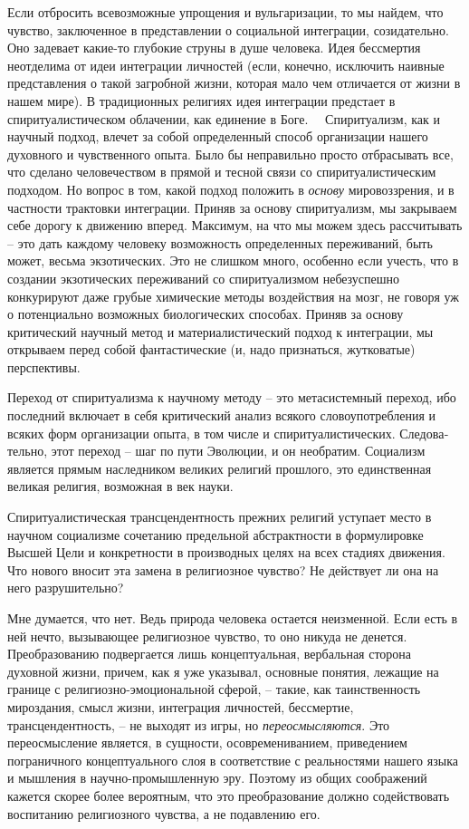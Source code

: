 \documentclass{book}
\begin{document}
Если отбросить всевозможные упрощения и вульгаризации, то мы найдем, что чувство, заключенное в представлении о со­циальной интеграции, созидательно. Оно задевает какие-то глу­бокие струны в душе человека. Идея бессмертия неотделима от идеи интеграции личностей (если, конечно, исключить наив­ные представления о такой загробной жизни, которая мало чем отличается от жизни в нашем мире). В традиционных религиях идея интеграции предстает в спиритуалистическом облачении, как единение в Боге.   Спиритуализм, как и научный подход, влечет за собой определенный способ организации нашего духов­ного и чувственного опыта. Было бы неправильно просто отбра­сывать все, что сделано человечеством в прямой и тесной связи со спиритуалистическим подходом. Но вопрос в том, какой подход положить в \textit{основу}  мировоззрения, и в частности трактовки интеграции. Приняв за основу спиритуализм, мы закры­ваем себе дорогу к движению вперед. Максимум, на что мы можем здесь рассчитывать -- это дать каждому человеку воз­можность 
определенных 
переживаний, быть может, весьма экзо­тических. Это не слишком много, особенно если учесть, что в создании экзотических переживаний со спиритуализмом небе­зуспешно конкурируют даже грубые химические методы воз­действия на мозг, не говоря уж о потенциально возможных биологических способах. Приняв за основу критический науч­ный метод и материалистический подход к интеграции, мы открываем перед собой фантастические (и, надо признаться, жутковатые) перспективы.

Переход от спиритуализма к научному методу -- это метасистемный переход, ибо последний включает в себя критиче­ский анализ всякого словоупотребления и всяких форм орга­низации опыта, в том числе и спиритуалистических. Следова­тельно, этот переход -- шаг по пути Эволюции, и он необратим. Социализм является прямым наследником великих религий прошлого, это единственная великая религия, возможная в век науки.

Спиритуалистическая трансцендентность прежних религий ус­тупает место в научном социализме сочетанию предельной аб­страктности в формулировке Высшей Цели и конкретности в производных целях на всех стадиях движения. Что нового вносит эта замена в религиозное чувство? Не действует ли она на него разрушительно?

Мне думается, что нет. Ведь природа человека остается неиз­менной. Если есть в ней нечто, вызывающее религиозное чувст­во, то оно никуда не денется. Преобразованию подвергается лишь концептуальная, вербальная сторона духовной жизни, причем, как я уже указывал, основные понятия, лежащие на границе с религиозно-эмоциональной сферой, -- такие, как таинст­венность мироздания, смысл жизни, интеграция личностей, бес­смертие, трансцендентность, -- не выходят из игры, но \textit{перео­смысляются}.  Это переосмысление является, в сущности, осовремениванием, приведением пограничного концептуального слоя в соответствие с реальностями нашего языка и мышления в научно-промышленную эру. Поэтому из общих соображений кажется скорее более вероятным, что это преобразование должно содействовать воспитанию религиозного чувства, а не подавлению его.
\end{document}

